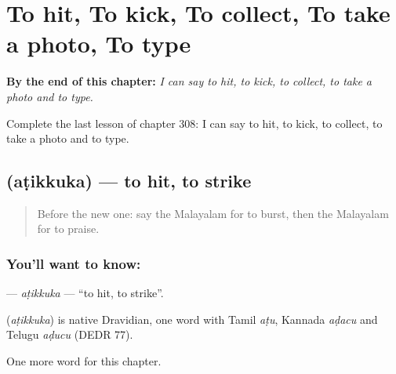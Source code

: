 
\chapter{To hit, To kick, To collect, To take a photo, To type}
\label{ch:ml-to-hit-to-kick-to-collect-to-take-a-photo-to-type}

\begin{chapteropening}
\textbf{By the end of this chapter:} \emph{I can say to hit, to kick, to collect, to take a photo and to type.}

Complete the last lesson of chapter 308: I can say to hit, to kick, to collect, to take a photo and to type.
\end{chapteropening}

\section[\texorpdfstring{\ml{അടിക്കുക} (aṭikkuka)}{അടിക്കുക (aṭikkuka)}]{ (aṭikkuka) — to hit, to strike}

\label{lesson:ML-C308-atikkuka}



\begin{quote}
Before the new one: say the Malayalam for to burst, then the Malayalam for to praise.
\end{quote}

\subsection*{You'll want to know: }
\textbf{} — \emph{aṭikkuka} — \textquotedblleft{}to hit, to strike\textquotedblright{}.

\begin{cousinweb}
\textbf{} (\emph{aṭikkuka}) is native Dravidian, one word with Tamil \emph{aṭu}, Kannada \emph{aḍacu} and Telugu \emph{aḍucu} (DEDR 77).
\end{cousinweb}

\begin{grammarlens}[title={What you've built}]
One more word for this chapter.
\end{grammarlens}

